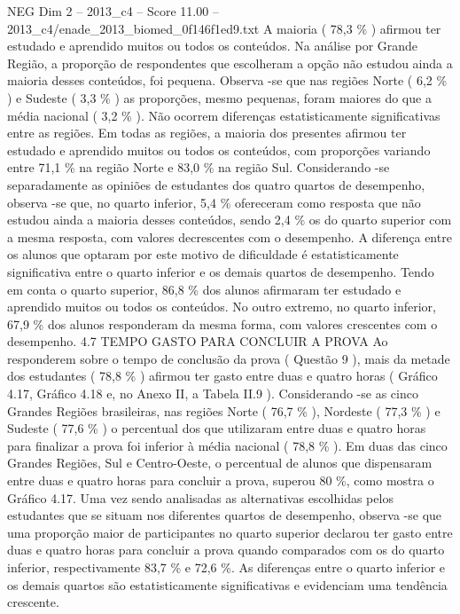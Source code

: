 \begin{textsample}{NEG Dim 2 – 2013\_c4 – Score 11.00 – 2013\_c4/enade\_2013\_biomed\_0f146f1ed9.txt}
A maioria ( 78,3 \% ) afirmou ter estudado e aprendido muitos ou todos os conteúdos.
Na análise por Grande Região, a proporção de respondentes que escolheram a opção não estudou ainda a maioria desses conteúdos, foi pequena.
Observa -se que nas regiões Norte ( 6,2 \% ) e Sudeste ( 3,3 \% ) as proporções, mesmo pequenas, foram maiores do que a média nacional ( 3,2 \% ).
Não ocorrem diferenças estatisticamente significativas entre as regiões.
Em todas as regiões, a maioria dos presentes afirmou ter estudado e aprendido muitos ou todos os conteúdos, com proporções variando entre 71,1 \% na região Norte e 83,0 \% na região Sul.
Considerando -se separadamente as opiniões de estudantes dos quatro quartos de desempenho, observa -se que, no quarto inferior, 5,4 \% ofereceram como resposta que não estudou ainda a maioria desses conteúdos, sendo 2,4 \% os do quarto superior com a mesma resposta, com valores decrescentes com o desempenho.
A diferença entre os alunos que optaram por este motivo de dificuldade é estatisticamente significativa entre o quarto inferior e os demais quartos de desempenho.
Tendo em conta o quarto superior, 86,8 \% dos alunos afirmaram ter estudado e aprendido muitos ou todos os conteúdos.
No outro extremo, no quarto inferior, 67,9 \% dos alunos responderam da mesma forma, com valores crescentes com o desempenho. 4.7 TEMPO GASTO PARA CONCLUIR A PROVA Ao responderem sobre o tempo de conclusão da prova ( Questão 9 ), mais da metade dos estudantes ( 78,8 \% ) afirmou ter gasto entre duas e quatro horas ( Gráfico 4.17, Gráfico 4.18 e, no Anexo II, a Tabela II.9 ).
Considerando -se as cinco Grandes Regiões brasileiras, nas regiões Norte ( 76,7 \% ), Nordeste ( 77,3 \% ) e Sudeste ( 77,6 \% ) o percentual dos que utilizaram entre duas e quatro horas para finalizar a prova foi inferior à média nacional ( 78,8 \% ).
Em duas das cinco Grandes Regiões, Sul e Centro-Oeste, o percentual de alunos que dispensaram entre duas e quatro horas para concluir a prova, superou 80 \%, como mostra o Gráfico 4.17.
Uma vez sendo analisadas as alternativas escolhidas pelos estudantes que se situam nos diferentes quartos de desempenho, observa -se que uma proporção maior de participantes no quarto superior declarou ter gasto entre duas e quatro horas para concluir a prova quando comparados com os do quarto inferior, respectivamente 83,7 \% e 72,6 \%.
As diferenças entre o quarto inferior e os demais quartos são estatisticamente significativas e evidenciam uma tendência crescente.

\end{textsample}
